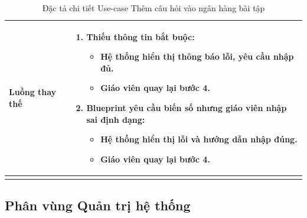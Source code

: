\begin{longtable}{|p{}|p{}|}
\textbf{Luồng thay thế} &
\vspace{-\baselineskip}
\begin{enumerate}[topsep=2pt, itemsep=0pt]
    \item[4a.] Thiếu thông tin bắt buộc:
    \begin{itemize}[topsep=0pt, itemsep=0pt]
        \item Hệ thống hiển thị thông báo lỗi, yêu cầu nhập đủ.
        \item Giáo viên quay lại bước 4.
    \end{itemize}
    \item[4b.] Blueprint yêu cầu biến số nhưng giáo viên nhập sai định dạng:
    \begin{itemize}[topsep=0pt, itemsep=0pt]
        \item Hệ thống hiển thị lỗi và hướng dẫn nhập đúng.
        \item Giáo viên quay lại bước 4.
    \end{itemize}
\end{enumerate} \\
\hline
\caption{Đặc tả chi tiết Use-case Thêm câu hỏi vào ngân hàng bài tập}
\label{table:uc-add-question}
\end{longtable}

\clearpage

\subsection{Phân vùng Quản trị hệ thống}

